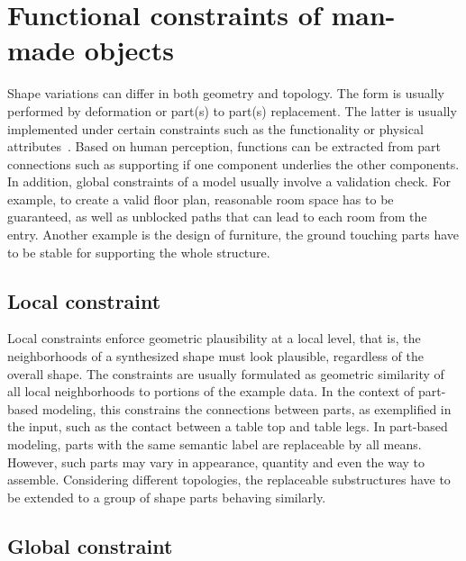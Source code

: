 \section{Functional constraints of man-made objects}

Shape variations can differ in both geometry and topology. The form is usually performed by deformation or part(s) to part(s) replacement. The latter is usually implemented under certain constraints such as the functionality or physical attributes~\cite{mitra_howThingsWork_sig_10,Zheng:2013}. Based on human perception, functions can be extracted from part connections such as supporting if one component underlies the other components. In addition, global constraints of a model usually involve a validation check. For example, to create a valid floor plan, reasonable room space has to be guaranteed, as well as unblocked paths that can lead to each room from the entry. Another example is the design of furniture, the ground touching parts have to be stable for supporting the whole structure.

\subsection{Local constraint}

Local constraints enforce geometric plausibility at a local level, that is, the neighborhoods of a synthesized shape must look plausible, regardless of the overall shape. The constraints are usually formulated as geometric similarity of all local neighborhoods to portions of the example data. In the context of part-based modeling, this constrains the connections between parts, as exemplified in the input, such as the contact between a table top and table legs. In part-based modeling, parts with the same semantic label are replaceable by all means. However, such parts may vary in appearance, quantity and even the way to assemble. Considering different topologies, the replaceable substructures have to be extended to a group of shape parts behaving similarly.


\subsection{Global constraint}

